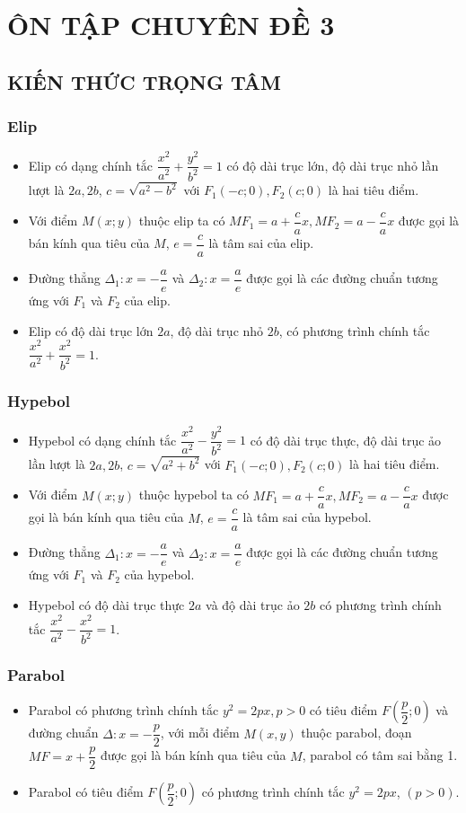 \section{ÔN TẬP CHUYÊN ĐỀ 3}
\subsection{KIẾN THỨC TRỌNG TÂM}
\subsubsection{Elip}
\begin{itemize}
\item Elip có dạng chính tắc $\dfrac{x^2}{a^2}+\dfrac{y^2}{b^2}=1$ có độ dài trục lớn, độ dài trục nhỏ lần lượt là $2a, 2b$,  $c=\sqrt{a^2-b^2}$ với $F_1(-c;0), F_2(c;0) $ là hai tiêu điểm.
\item Với điểm $M(x;y)$ thuộc elip ta có $MF_1=a+\dfrac{c}{a}x, MF_2=a-\dfrac{c}{a} x$ được gọi là bán kính qua tiêu của $M$, $e=\dfrac{c}{a}$ là tâm sai của elip.
\item Đường thẳng $\Delta_1: x=-\dfrac{a}{e}$ và $\Delta_2: x=\dfrac{a}{e}$ được gọi là các đường chuẩn tương ứng với $F_1$ và $F_2$ của elip.
\item Elip có độ dài trục lớn $2a$, độ dài trục nhỏ $2b$, có phương trình chính tắc $\dfrac{x^2}{a^2}+\dfrac{x^2}{b^2}=1$.
\end{itemize}
\subsubsection{Hypebol}
\begin{itemize}
\item Hypebol có dạng chính tắc $\dfrac{x^2}{a^2}-\dfrac{y^2}{b^2}=1$ có độ dài trục thực, độ dài trục ảo lần lượt là $2a, 2b$,  $c=\sqrt{a^2+b^2}$ với $F_1(-c;0), F_2(c;0) $ là hai tiêu điểm.
\item Với điểm $M(x;y)$ thuộc hypebol ta có $MF_1=a+\dfrac{c}{a}x, MF_2=a-\dfrac{c}{a} x$ được gọi là bán kính qua tiêu của $M$, $e=\dfrac{c}{a}$ là tâm sai của hypebol.
\item Đường thẳng $\Delta_1: x=-\dfrac{a}{e}$ và $\Delta_2: x=\dfrac{a}{e}$ được gọi là các đường chuẩn tương ứng với $F_1$ và $F_2$ của hypebol.
\item Hypebol có độ dài trục thực $2a$ và độ dài trục ảo $2b$ có phương trình chính tắc $\dfrac{x^2}{a^2}-\dfrac{x^2}{b^2}=1$. 
\end{itemize}
\subsubsection{Parabol}
\begin{itemize}
	\item Parabol có phương trình chính tắc $y^2=2px, p>0$ có tiêu điểm $F\left( \dfrac{p}{2};0  \right) $ và đường chuẩn $\Delta: x=-\dfrac{p}{2}$, với mỗi điểm $M(x,y)$ thuộc parabol, đoạn $MF= x+\dfrac{p}{2}$ được gọi là bán kính qua tiêu của $M$, parabol có tâm sai bằng 1.
	\item Parabol có tiêu điểm $F\left( \dfrac{p}{2};0\right) $ có phương trình chính tắc $y^2=2px$, $(p>0)$. 
\end{itemize}
